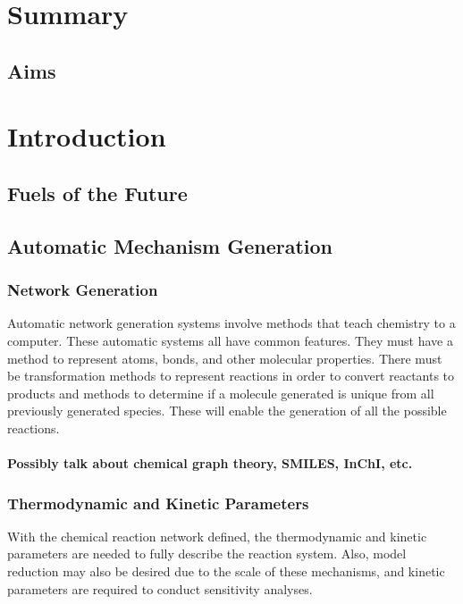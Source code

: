 \documentclass[12pt]{article}
\begin{document}
\title{}
\author{Pierre L. Bhoorasingh}
\date{\today}
\maketitle

\newpage
\tableofcontents

\newpage

\section{Summary}

\subsection{Aims}

\section{Introduction}

\subsection{Fuels of the Future}

\subsection{Automatic Mechanism Generation}

\subsubsection{Network Generation}
Automatic network generation systems involve methods that teach chemistry to a computer. These automatic systems all have common features. They must have a method to represent atoms, bonds, and other molecular properties. There must be transformation methods to represent reactions in order to convert reactants to products and methods to determine if a molecule generated is unique from all previously generated species. These will enable the generation of all the possible reactions.

\paragraph{Possibly talk about chemical graph theory, SMILES, InChI, etc.}

\subsubsection{Thermodynamic and Kinetic Parameters}
With the chemical reaction network defined, the thermodynamic and kinetic parameters are needed to fully describe the reaction system. Also, model reduction may also be desired due to the scale of these mechanisms, and kinetic parameters are required to conduct sensitivity analyses.
\end{document}
